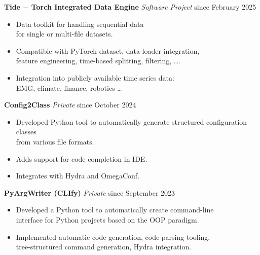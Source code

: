 \documentclass{article}
\begin{document}
\noindent \textbf{Tide $-$ Torch Integrated Data Engine} \textit{Software Project} \href{https://github.com/RobinU434/Tide}{\faGithubSquare}\hfill since February 2025
\begin{itemize}[noitemsep,nolistsep,leftmargin=*]
    \item Data toolkit for handling sequential data \\
    for single or multi-file datasets. 
    \item Compatible with PyTorch dataset, data-loader integration, \\
    feature engineering, time-based splitting, filtering, \ldots.
    \item Integration into publicly available time series data: \\
    EMG, climate, finance, robotics \ldots\\
\end{itemize} 


\noindent \textbf{Config2Class} \textit{Private} \href{https://github.com/RobinU434/Config2Class}{\faGithubSquare}\hfill since October 2024
\begin{itemize}[noitemsep,nolistsep,leftmargin=*]
    \item Developed Python tool to automatically generate structured configuration classes\\
    from various file formats.
    \item Adds support for code completion in IDE.
    \item Integrates with Hydra and OmegaConf.\\
\end{itemize}
 


\noindent \textbf{PyArgWriter (CLIfy)} \textit{Private} \href{https://github.com/RobinU434/PyArgWriter}{\faGithubSquare}\hfill since September 2023
\begin{itemize}[noitemsep,nolistsep,leftmargin=*]
    \item Developed a Python tool to automatically create command-line \\
    interface for Python projects based on the OOP paradigm.
    \item Implemented automatic code generation, code parsing tooling,\\ 
    tree-structured command generation, Hydra integration.\\
\end{itemize} 
\end{document}
